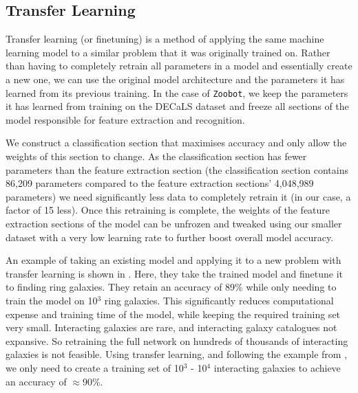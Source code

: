 \subsection{Transfer Learning}\label{trans_learn}
\noindent Transfer learning (or finetuning) is a method of applying the same machine learning model to a similar problem that it was originally trained on. Rather than having to completely retrain all parameters in a model and essentially create a new one, we can use the original model architecture and the parameters it has learned from its previous training. In the case of \texttt{Zoobot}, we keep the parameters it has learned from training on the DECaLS dataset and freeze all sections of the model responsible for feature extraction and recognition. 

We construct a classification section that maximises accuracy and only allow the weights of this section to change. As the classification section has fewer parameters than the feature extraction section (the classification section contains 86,209 parameters compared to the feature extraction sections' 4,048,989 parameters) we need significantly less data to completely retrain it (in our case, a factor of 15 less). Once this retraining is complete, the weights of the feature extraction sections of the model can be unfrozen and tweaked using our smaller dataset with a very low learning rate to further boost overall model accuracy.

An example of taking an existing model and applying it to a new problem with transfer learning is shown in \citet{2022MNRAS.513.1581W}. Here, they take the trained model and finetune it to finding ring galaxies. They retain an accuracy of 89\% while only needing to train the model on 10$^{3}$ ring galaxies. This significantly reduces computational expense and training time of the model, while keeping the required training set very small. Interacting galaxies are rare, and interacting galaxy catalogues not expansive. So retraining the full network on hundreds of thousands of interacting galaxies is not feasible. Using transfer learning, and following the example from \citet{2022MNRAS.513.1581W}, we only need to create a training set of 10$^{3}$ - 10$^{4}$ interacting galaxies to achieve an accuracy of $\approx$90\%. 

